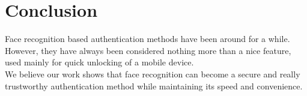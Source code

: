 \section{Conclusion}
    Face recognition based authentication methods have been around for a while. However,
    they have always been considered nothing more than a nice feature, used mainly for
    quick unlocking of a mobile device.\\
    We believe our work shows that face recognition can
    become a secure and really trustworthy authentication method while maintaining
    its speed and convenience.
